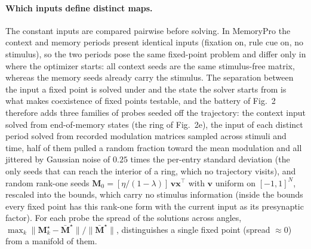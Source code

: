\documentclass{article}
\begin{document}
\paragraph{Which inputs define distinct maps.}
The constant inputs are compared pairwise before solving. In MemoryPro the context and memory periods present identical inputs (fixation on, rule cue on, no stimulus), so the two periods pose the same fixed-point problem and differ only in where the optimizer starts: all context seeds are the same stimulus-free matrix, whereas the memory seeds already carry the stimulus. The separation between the input a fixed point is solved under and the state the solver starts from is what makes coexistence of fixed points testable, and the battery of Fig.~2 therefore adds three families of probes seeded off the trajectory: the context input solved from end-of-memory states (the ring of Fig.~2e), the input of each distinct period solved from recorded modulation matrices sampled across stimuli and time, half of them pulled a random fraction toward the mean modulation and all jittered by Gaussian noise of $0.25$ times the per-entry standard deviation (the only seeds that can reach the interior of a ring, which no trajectory visits), and random rank-one seeds $\mathbf{M}_0 = [\eta/(1-\lambda)]\,\mathbf{v}\mathbf{x}^{\top}$ with $\mathbf{v}$ uniform on $[-1,1]^N$, rescaled into the bounds, which carry no stimulus information (inside the bounds every fixed point has this rank-one form with the current input as its presynaptic factor). For each probe the spread of the solutions across angles, $\max_k \lVert \mathbf{M}^\star_k - \bar{\mathbf{M}}^\star\rVert / \lVert \bar{\mathbf{M}}^\star\rVert$, distinguishes a single fixed point (spread $\approx 0$) from a manifold of them.
\end{document}
